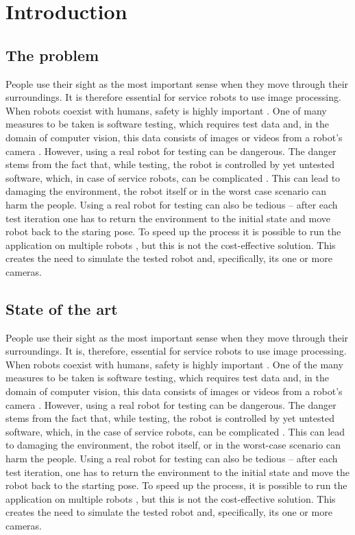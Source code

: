 \documentclass{svproc}
\begin{document}
\section{Introduction}

\subsection{The problem}

People use their sight as the most important sense when they move through their surroundings.
It is therefore essential for service robots to use image processing.
When robots coexist with humans, safety is highly important \cite{haddadin2007safety}.
One of many measures to be taken is software testing,
which requires test data and, in the domain of computer vision, this data consists of images or videos from a robot's camera \cite{7759425}.
However, using a real robot for testing can be dangerous.
The danger stems from the fact that, while testing, the robot is controlled by yet untested software, which, in case of service robots, can be complicated \cite{Dudek-multitasking-romoco-2019-twiki}. This can lead to damaging the environment, the robot itself or in the worst case scenario can harm the people.
Using a real robot for testing can also be tedious -- after each test iteration one has to return the environment to the initial state and move robot back to the staring pose.
To speed up the process it is possible to run the application on multiple robots \cite{levine2018learning}, but this is not the cost-effective solution.
This creates the need to simulate the tested robot and, specifically, its one or more cameras.

\subsection{State of the art}
People use their sight as the most important sense when they move through their surroundings.
It is, therefore, essential for service robots to use image processing.
When robots coexist with humans, safety is highly important \cite{haddadin2007safety}.
One of the many measures to be taken is software testing,
which requires test data and, in the domain of computer vision, this data consists of images or videos from a robot's camera \cite{7759425}.
However, using a real robot for testing can be dangerous.
The danger stems from the fact that, while testing, the robot is controlled by yet untested software, which, in the case of service robots, can be complicated \cite{Dudek-multitasking-romoco-2019-twiki}. This can lead to damaging the environment, the robot itself, or in the worst-case scenario can harm the people.
Using a real robot for testing can also be tedious -- after each test iteration, one has to return the environment to the initial state and move the robot back to the starting pose.
To speed up the process, it is possible to run the application on multiple robots \cite{levine2018learning}, but this is not the cost-effective solution.
This creates the need to simulate the tested robot and, specifically, its one or more cameras.
\end{document}
